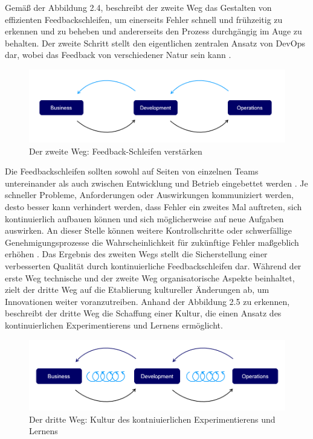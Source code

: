 Gemäß der Abbildung 2.4, beschreibt der zweite Weg das Gestalten von effizienten Feedbackschleifen, um einerseits Fehler schnell und frühzeitig zu erkennen und zu beheben und andererseits den Prozess durchgängig im Auge zu behalten. Der zweite Schritt stellt den eigentlichen zentralen Ansatz von DevOps dar, wobei das Feedback von verschiedener Natur sein kann \cite[S. 254]{tiemeyer_handbuch_2021}. 

\begin{figure}[h]
    \centering
    \includegraphics[scale=0.5]{Bilder/Second Way.png}
    \caption{Der zweite Weg: Feedback-Schleifen verstärken \cite{kim_three_2012}}
\end{figure}

Die Feedbackschleifen sollten sowohl auf Seiten von einzelnen Teams untereinander als auch zwischen Entwicklung und Betrieb eingebettet werden \cite[S. 94]{ravichandran_devops_2016}. Je schneller Probleme, Anforderungen oder Auswirkungen kommuniziert werden, desto besser kann verhindert werden, dass Fehler ein zweites Mal auftreten, sich kontinuierlich aufbauen können und sich möglicherweise auf neue Aufgaben auswirken. An dieser Stelle können weitere Kontrollschritte oder schwerfällige Genehmigungsprozesse die Wahrscheinlichkeit für zukünftige Fehler maßgeblich erhöhen \cite[S. 31]{kim_devops-handbuch_2017}. Das Ergebnis des zweiten Wegs stellt die Sicherstellung einer verbesserten Qualität durch kontinuierliche Feedbackschleifen dar. Während der erste Weg technische und der zweite Weg organisatorische Aspekte beinhaltet, zielt der dritte Weg auf die Etablierung kultureller Änderungen ab, um Innovationen weiter voranzutreiben. Anhand der Abbildung 2.5 zu erkennen, beschreibt der dritte Weg die Schaffung einer Kultur, die einen Ansatz des kontinuierlichen Experimentierens und Lernens ermöglicht. 

\begin{figure}[h]
    \centering
    \includegraphics[scale=0.5]{Bilder/Third Way.png}
    \caption{Der dritte Weg: Kultur des kontniuierlichen Experimentierens und Lernens \cite{kim_three_2012}}
\end{figure}


